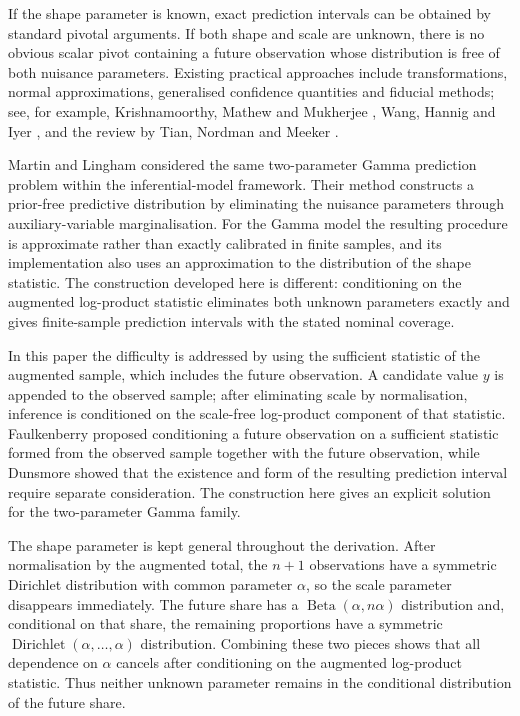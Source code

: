 \documentclass[11pt]{article}
\theoremstyle{remark}
\begin{document}
If the shape parameter is known, exact prediction intervals can be obtained by standard pivotal arguments. 
If both shape and scale are unknown, there is no obvious scalar pivot containing a future observation whose 
distribution is free of both nuisance parameters. Existing practical approaches include transformations, 
normal approximations, generalised confidence quantities and fiducial methods; see,
for example, Krishnamoorthy, Mathew and Mukherjee \cite{Krishnamoorthy2008}, Wang, Hannig and Iyer \cite{Wang2012}, 
and the review by Tian, Nordman and Meeker \cite{Tian2022}.

Martin and Lingham \cite{MartinLingham2016} considered the same two-parameter Gamma prediction problem within the inferential-model framework. Their method constructs a prior-free predictive distribution by eliminating the nuisance parameters through auxiliary-variable marginalisation. For the Gamma model the resulting procedure is approximate rather than exactly calibrated in finite samples, and its implementation also uses an approximation to the distribution of the shape statistic. The construction developed here is different: conditioning on the augmented log-product statistic eliminates both unknown parameters exactly and gives finite-sample prediction intervals with the stated nominal coverage.

In this paper the difficulty is addressed by using the sufficient statistic of the augmented sample, which includes the future observation. A candidate value $y$ is appended to the observed sample; after eliminating scale by normalisation, inference is conditioned on the scale-free log-product component of that statistic.
Faulkenberry \cite{Faulkenberry1973} proposed conditioning a future observation on a sufficient statistic formed from the observed sample together with the future observation, while Dunsmore \cite{Dunsmore1976} showed that the existence and form of the resulting prediction interval require separate consideration. The construction here gives an explicit solution for the two-parameter Gamma family.

The shape parameter is kept general throughout the derivation. After normalisation by the augmented total,
the $n+1$ observations have a symmetric Dirichlet distribution with common parameter $\alpha$, 
so the scale parameter disappears immediately. The future share has a $\operatorname{Beta}(\alpha,n\alpha)$ 
distribution and, conditional on that share, the remaining proportions have a 
symmetric $\operatorname{Dirichlet}(\alpha,\ldots,\alpha)$ distribution.
Combining these two pieces shows that all dependence on $\alpha$ cancels after conditioning on the augmented log-product statistic. Thus neither unknown parameter remains in the conditional distribution of the future share.
\end{document}
